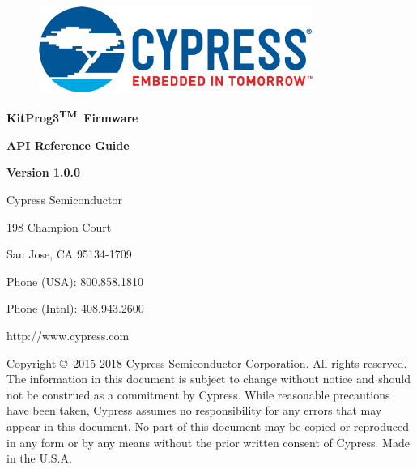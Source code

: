 \documentclass[twoside]{book}
\newcommand{\+}{\discretionary{\mbox{\scriptsize$\hookleftarrow$}}{}{}}
\begin{document}
\hypersetup{pageanchor=false,
             bookmarks=true,
             bookmarksnumbered=true,
             pdfencoding=unicode
            }
\begin{titlepage}
\vspace*{1cm}
\begin{figure}
\includegraphics{CyLogo}
\end{figure}

\vspace*{6cm}
\begin{center}%
{\hfill \Large \textbf{KitProg3\textsuperscript{TM}\ Firmware}}

{\hfill \Large \textbf{API Reference Guide}}

{\hfill \Large \textbf{Version 1.0.0}}\\
\end{center}
\vspace*{6cm}
\hfill Cypress Semiconductor

\hfill 198 Champion Court

\hfill San Jose, CA 95134-1709

\hfill Phone (USA): 800.858.1810

\hfill Phone (Intnl): 408.943.2600

\hfill http://www.cypress.com

\vspace*{1cm}
\end{titlepage}

\vspace*{1cm}
{\large Copyright \copyright\ 2015-2018 Cypress Semiconductor Corporation. All rights reserved.}\\

The information in this document is subject to change without notice and should not be construed as
a commitment by Cypress. While reasonable precautions have been taken, Cypress assumes no responsibility
for any errors that may appear in this document. No part of this document may be copied or reproduced in
any form or by any means without the prior written consent of Cypress. Made in the U.S.A.
\end{document}

